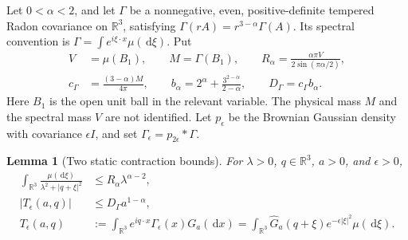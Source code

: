 \documentclass[12pt]{article}
\numberwithin{equation}{section}
\newtheorem{lemma}[theorem]{Lemma}
\theoremstyle{definition}
\newcommand{\R}{\mathbb{R}}
\newcommand{\ud}{\,\mathrm{d}}
\begin{document}
Let $0<\alpha<2$, and let $\Gamma$ be a nonnegative, even,
positive-definite tempered Radon covariance on $\R^3$, satisfying
$\Gamma(rA)=r^{3-\alpha}\Gamma(A)$. Its spectral convention is
$\Gamma=\int e^{i\xi\cdot x}\mu(\ud\xi)$. Put
\begin{equation}\label{E:phase-constants}
  \begin{split}
    V&=\mu(B_1),\qquad M=\Gamma(B_1),\qquad
    R_\alpha=\frac{\alpha\pi V}{2\sin(\pi\alpha/2)},\\
    c_\Gamma&=\frac{(3-\alpha)M}{4\pi},\qquad
    b_\alpha=2^\alpha+\frac{3^{2-\alpha}}{2-\alpha},\qquad
    D_\Gamma=c_\Gamma b_\alpha.
  \end{split}
\end{equation}
Here $B_1$ is the open unit ball in the relevant variable.
The physical mass $M$ and the spectral mass $V$ are not identified.
Let $p_\epsilon$ be the Brownian Gaussian density with covariance
$\epsilon I$, and set
$\Gamma_\epsilon=p_{2\epsilon}*\Gamma$.

\begin{lemma}[Two static contraction bounds]\label{L:phase-contractions}
  For $\lambda>0$, $q\in\R^3$, $a>0$, and $\epsilon>0$,
  \begin{align}
    \int_{\R^3}\frac{\mu(\ud\xi)}{\lambda^2+|q+\xi|^2}
    &\le R_\alpha\lambda^{\alpha-2},
    \label{E:phase-resolvent}\\
    \left|T_\epsilon(a,q)\right|
    &\le D_\Gamma a^{1-\alpha},
    \label{E:phase-trace}\\
    T_\epsilon(a,q)
    &:=\int_{\R^3}e^{iq\cdot x}\Gamma_\epsilon(x)G_a(\ud x)
    =\int_{\R^3}\widehat G_a(q+\xi)e^{-\epsilon|\xi|^2}
    \mu(\ud\xi).\nonumber
  \end{align}
\end{lemma}
\end{document}

